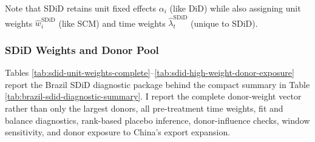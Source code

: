 \documentclass[referee,pdflatex,sn-basic]{sn-jnl}
\theoremstyle{thmstylethree}
\begin{document}
Note that SDiD retains unit fixed effects \(\alpha_i\) (like DiD) while also assigning unit weights \(\hat{w}^{\text{SDiD}}_i\) (like SCM) and time weights \(\hat{\lambda}^{\text{SDiD}}_t\) (unique to SDiD).

\subsubsection{SDiD Weights and Donor Pool}\label{sdid-weights-and-donor-pool}

Tables \ref{tab:sdid-unit-weights-complete}--\ref{tab:sdid-high-weight-donor-exposure} report the Brazil SDiD diagnostic package behind the compact summary in Table \ref{tab:brazil-sdid-diagnostic-summary}. I report the complete donor-weight vector rather than only the largest donors, all pre-treatment time weights, fit and balance diagnostics, rank-based placebo inference, donor-influence checks, window sensitivity, and donor exposure to China's export expansion.

\begingroup\fontsize{7}{9}\selectfont
\end{document}
